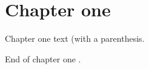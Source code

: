 \section{Chapter one}
Chapter one text (with a parenthesis.

End of chapter one \errorinchapterone.
